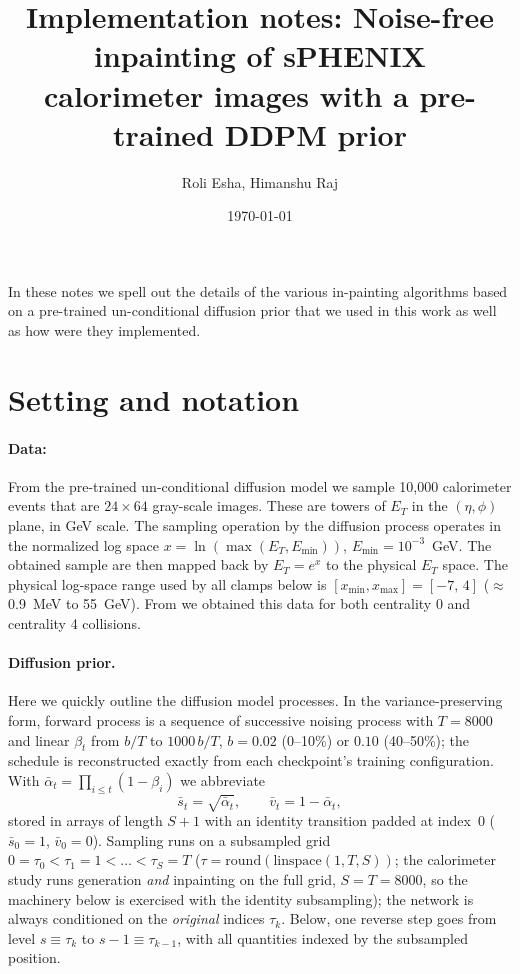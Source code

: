 \documentclass[11pt]{article}
\title{Implementation notes: Noise-free inpainting of sPHENIX\\
        calorimeter images with a pre-trained DDPM prior}
\date{\today}
\author{Roli Esha, Himanshu Raj}
\def\({\left(}
\def\){\right)}
\begin{document}
\maketitle

In these notes we spell out the details of the various in-painting algorithms based on a pre-trained un-conditional diffusion prior that we used in this work as well as how were they implemented.

\section{Setting and notation}
\label{sec:setup}

\paragraph{Data:}
From the pre-trained un-conditional diffusion model we sample 10,000 calorimeter events that are $24 \times 64$ gray-scale images. These are towers of $E_T$ in the $(\eta,\phi)$ plane, in GeV scale.  The sampling operation by the diffusion process operates in the normalized log space $x = \ln \(\max(E_T, E_{\min})\)$, $E_{\min}=10^{-3}$~GeV. The obtained sample are then mapped back by $E_T = e^{x}$ to the physical $E_T$ space. The physical log-space range used by all clamps below is $[x_{\min}, x_{\max}] = [-7,\, 4]$ ($\approx$ 0.9~MeV to 55~GeV). From \cite{torbunov2024calo} we obtained this data for both centrality 0 and centrality 4 collisions. 

\paragraph{Diffusion prior.}
Here we quickly outline the diffusion model processes. In the variance-preserving form, forward process is a sequence of successive noising process with $T = 8000$ and linear $\beta_t$ from $b/T$ to $1000\,b/T$, $b = 0.02$ (0--10\%) or $0.10$ (40--50\%); the schedule is reconstructed exactly from each checkpoint's training configuration.  With $\bar\alpha_t = \prod_{i \le t} (1 - \beta_i)$ we abbreviate
\begin{equation}
  \bar s_t = \sqrt{\bar\alpha_t}, \qquad
  \bar v_t = 1 - \bar\alpha_t ,
\end{equation}
stored in arrays of length $S{+}1$ with an identity transition padded at index~0 ($\bar s_0 = 1$, $\bar v_0 = 0$).  Sampling runs on a subsampled grid $0 = \tau_0 < \tau_1 = 1 < \dots < \tau_S = T$ ($\tau = \mathrm{round}(\mathrm{linspace}(1,T,S))$; the calorimeter study runs generation \emph{and} inpainting on the full grid, $S = T = 8000$, so the machinery below is exercised with the identity subsampling); the network is always conditioned on the \emph{original} indices $\tau_k$.  Below, one reverse step goes from level $s \equiv \tau_k$ to $s{-}1 \equiv \tau_{k-1}$, with all quantities indexed by the subsampled position.
\end{document}
